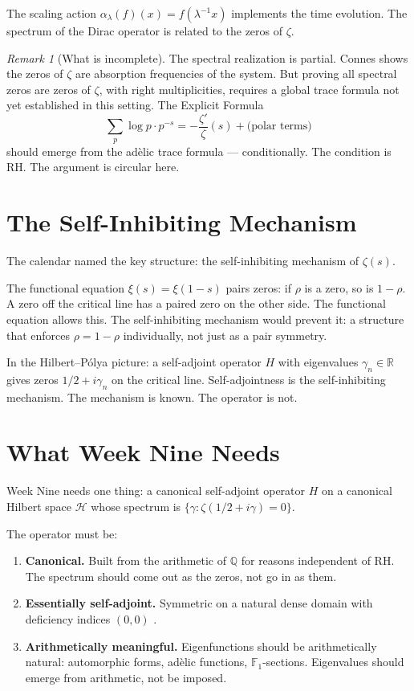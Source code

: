 \documentclass[12pt]{article}
\theoremstyle{definition}
\theoremstyle{remark}
\newtheorem{remark}[theorem]{Remark}
\begin{document}
The scaling action $\alpha_\lambda(f)(x) = f(\lambda^{-1}x)$
implements the time evolution.
The spectrum of the Dirac operator is related to the zeros of $\zeta$.

\begin{remark}[What is incomplete]
The spectral realization is partial.
Connes shows the zeros of $\zeta$ are absorption frequencies of the system.
But proving all spectral zeros are zeros of $\zeta$, with right multiplicities,
requires a global trace formula not yet established in this setting.
The Explicit Formula
$$\sum_p \log p \cdot p^{-s} = -\frac{\zeta'}{\zeta}(s) + \text{(polar terms)}$$
should emerge from the adèlic trace formula --- conditionally.
The condition is RH. The argument is circular here.
\end{remark}

\section{The Self-Inhibiting Mechanism}

The calendar named the key structure: the self-inhibiting mechanism of $\zeta(s)$.

The functional equation $\xi(s) = \xi(1-s)$ pairs zeros:
if $\rho$ is a zero, so is $1-\rho$.
A zero off the critical line has a paired zero on the other side.
The functional equation allows this.
The self-inhibiting mechanism would prevent it:
a structure that enforces $\rho = 1-\rho$ individually,
not just as a pair symmetry.

In the Hilbert--P\'olya picture:
a self-adjoint operator $H$ with eigenvalues $\gamma_n \in \mathbb{R}$
gives zeros $1/2 + i\gamma_n$ on the critical line.
Self-adjointness is the self-inhibiting mechanism.
The mechanism is known.
The operator is not.

\section{What Week Nine Needs}

Week Nine needs one thing:
a canonical self-adjoint operator $H$ on a canonical Hilbert space $\mathcal{H}$
whose spectrum is $\{\gamma : \zeta(1/2 + i\gamma) = 0\}$.

The operator must be:
\begin{enumerate}
\item \textbf{Canonical.} Built from the arithmetic of $\mathbb{Q}$
  for reasons independent of RH.
  The spectrum should come out as the zeros, not go in as them.

\item \textbf{Essentially self-adjoint.}
  Symmetric on a natural dense domain with deficiency indices $(0,0)$ \cite{deficiency}.

\item \textbf{Arithmetically meaningful.}
  Eigenfunctions should be arithmetically natural:
  automorphic forms, adèlic functions, $\mathbb{F}_1$-sections.
  Eigenvalues should emerge from arithmetic, not be imposed.
\end{enumerate}
\end{document}
